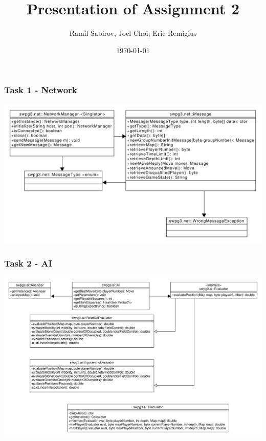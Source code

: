 \documentclass{beamer}
\title[Assignment2]{Presentation of Assignment 2} %
\author{Ramil Sabirov, Joel Choi, Eric Remigius} %
\institute[] %
{
RWTH Aachen \\ %
\medskip
\textit{Gruppe 3}
}
\date{\today} %
\begin{document}
\begin{frame}
\titlepage %
\end{frame}


\begin{frame}
\frametitle{Task 1 - Network}

\includegraphics[width=\textwidth]{NetPackageClassdiagramm}

\end{frame}


\begin{frame}
\frametitle{Task 2 - AI}

\includegraphics[width=\textwidth]{AI_Classdiagram(updated).pdf}
\end{frame}
\end{document}
